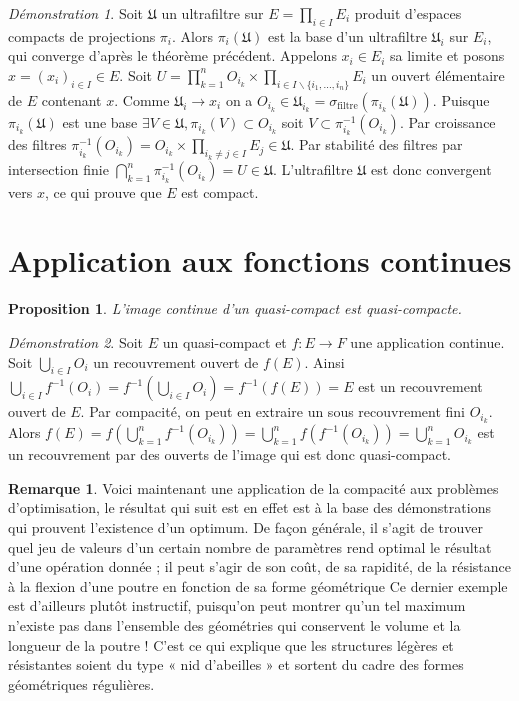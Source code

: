 \documentclass[a4paper, 11pt, french]{book}
\theoremstyle{plain} %
\newtheorem{proposition}{Proposition}
\theoremstyle{definition} %
\newtheorem{remarque}{Remarque}
\theoremstyle{remark} %
\newtheorem*{demonstration}{Démonstration}
\renewcommand{\setminus}{\backslash}
\newcommand{\1}{\mathds{1}}
\newcommand{\inv}[1]{#1^{-1}}
\renewcommand{\frak}[1]{\mathfrak{#1}}
\renewcommand{\rm}[1]{\mathrm{#1}}
\begin{document}
\begin{demonstration}
	Soit $\frak{U}$ un ultrafiltre sur $E=\prod_{i\in I}E_i$ produit d'espaces compacts de projections $\pi_i$.
	Alors $\pi_i(\frak{U})$ est la base d'un ultrafiltre $\frak{U}_i$ sur $E_i$, qui converge d'après le théorème précédent.
	Appelons $x_i\in E_i$ sa limite et posons $x=(x_i)_{i\in I}\in E$.
	Soit $U=\prod_{k=1}^nO_{i_k}\times\prod_{i\in I\setminus\{i_1, ..., i_n\}}E_i$ un ouvert élémentaire de $E$ contenant $x$.
	Comme $\frak{U}_i\rightarrow x_i$ on a $O_{i_k}\in\frak{U}_{i_k}=\sigma_\rm{filtre}(\pi_{i_k}(\frak{U}))$.
	Puisque $\pi_{i_k}(\frak{U})$ est une base $\exists V\in\frak{U}, \pi_{i_k}(V)\subset O_{i_k}$ soit $V\subset\inv{\pi_{i_k}}(O_{i_k})$.
	Par croissance des filtres $\inv{\pi_{i_k}}(O_{i_k})=O_{i_k}\times\prod_{i_k\neq j\in I}E_j\in\frak{U}$.
	Par stabilité des filtres par intersection finie $\bigcap_{k=1}^n\inv{\pi_{i_k}}(O_{i_k})=U\in\frak{U}$.
	L’ultrafiltre $\frak{U}$ est donc convergent vers $x$, ce qui prouve que $E$ est compact.
\end{demonstration}

\section{Application aux fonctions continues}

\begin{proposition}
	L’image continue d’un quasi-compact est quasi-compacte.
\end{proposition}

\begin{demonstration}
	Soit $E$ un quasi-compact et $f:E\rightarrow F$ une application continue.
	Soit $\bigcup_{i\in I}O_i$ un recouvrement ouvert de $f(E)$.
	Ainsi $\bigcup_{i\in I}\inv{f}(O_i)=\inv{f}(\bigcup_{i\in I}O_i)=\inv{f}(f(E))=E$ est un recouvrement ouvert de $E$.
	Par compacité, on peut en extraire un sous recouvrement fini $O_{i_k}$.
	Alors $f(E)=f(\bigcup_{k=1}^n\inv{f}(O_{i_k}))=\bigcup_{k=1}^nf(\inv{f}(O_{i_k}))=\bigcup_{k=1}^nO_{i_k}$ est un recouvrement par des ouverts de l'image qui est donc quasi-compact.
\end{demonstration}

\begin{remarque}
	Voici maintenant une application de la compacité aux problèmes d’optimisation, le résultat qui suit est en effet est à la base des démonstrations qui prouvent l’existence d’un optimum.
	De façon générale, il s’agit de trouver quel jeu de valeurs d’un certain nombre de paramètres rend optimal le résultat d’une opération donnée ; il peut s’agir de son coût, de sa rapidité, de la résistance à la flexion d’une poutre en fonction de sa forme géométrique Ce dernier exemple est d’ailleurs plutôt instructif, puisqu’on peut montrer qu’un tel maximum n’existe pas dans l’ensemble des géométries qui conservent le volume et la longueur de la poutre !
	C’est ce qui explique que les structures légères et résistantes soient du type « nid d’abeilles » et sortent du cadre des formes géométriques régulières.
\end{remarque}
\end{document}
